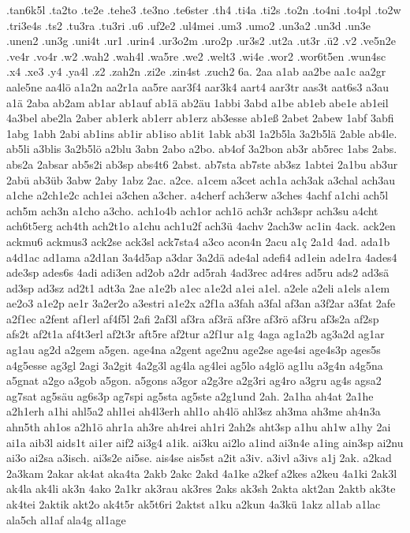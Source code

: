 {.tan6k5l
.ta2to
.te2e
.tehe3
.te3no
.te6ster
.th4
.ti4a
.ti2s
.to2n
.to4ni
.to4pl
.to2w
.tri3e4s
.ts2
.tu3ra
.tu3ri
.u6
.uf2e2
.ul4mei
.um3
.umo2
.un3a2
.un3d
.un3e
.unen2
.un3g
.uni4t
.ur1
.urin4
.ur3o2m
.uro2p
.ur3s2
.ut2a
.ut3r
.ü2
.v2
.ve5n2e
.ve4r
.vo4r
.w2
.wah2
.wah4l
.wa5re
.we2
.welt3
.wi4e
.wor2
.wor6t5en
.wun4sc
.x4
.xe3
.y4
.ya4l
.z2
.zah2n
.zi2e
.zin4st
.zuch2
6a.
2aa
a1ab
aa2be
aa1c
aa2gr
aale5ne
aa4lö
a1a2n
aa2r1a
aa5re
aar3f4
aar3k4
aart4
aar3tr
aas3t
aat6s3
a3au
a1ä
2aba
ab2am
ab1ar
ab1auf
ab1ä
ab2äu
1abbi
3abd
a1be
ab1eb
abe1e
ab1eil
4a3bel
abe2la
2aber
ab1erk
ab1err
ab1erz
ab3esse
ab1eß
2abet
2abew
1abf
3abfi
1abg
1abh
2abi
ab1ins
ab1ir
ab1iso
ab1it
1abk
ab3l
1a2b5la
3a2b5lä
2able
ab4le.
ab5li
a3blis
3a2b5lö
a2blu
3abn
2abo
a2bo.
ab4of
3a2bon
ab3r
ab5rec
1abs
2abs.
abs2a
2absar
ab5s2i
ab3sp
abs4t6
2abst.
ab7sta
ab7ste
ab3sz
1abtei
2a1bu
ab3ur
2abü
ab3üb
3abw
2aby
1abz
2ac.
a2ce.
a1cem
a3cet
ach1a
ach3ak
a3chal
ach3au
a1che
a2ch1e2c
ach1ei
a3chen
a3cher.
a4cherf
ach3erw
a3ches
4achf
a1chi
ach5l
ach5m
ach3n
a1cho
a3cho.
ach1o4b
ach1or
ach1ö
ach3r
ach3spr
ach3su
a4cht
ach6t5erg
ach4th
ach2t1o
a1chu
ach1u2f
ach3ü
4achv
2ach3w
ac1in
4ack.
ack2en
ackmu6
ackmus3
ack2se
ack3sl
ack7sta4
a3co
acon4n
2acu
a1ç
2a1d
4ad.
ada1b
a4d1ac
ad1ama
a2d1an
3a4d5ap
a3dar
3a2dä
ade4al
adefi4
ad1ein
ade1ra
4ades4
ade3sp
ades6s
4adi
adi3en
ad2ob
a2dr
ad5rah
4ad3rec
ad4res
ad5ru
ads2
ad3sä
ad3sp
ad3sz
ad2t1
adt3a
2ae
a1e2b
a1ec
a1e2d
a1ei
a1el.
a2ele
a2eli
a1els
a1em
ae2o3
a1e2p
ae1r
3a2er2o
a3estri
a1e2x
a2f1a
a3fah
a3fal
af3an
a3f2ar
a3fat
2afe
a2f1ec
a2fent
af1erl
af4f5l
2afi
2af3l
af3ra
af3rä
af3re
af3rö
af3ru
af3s2a
af2sp
afs2t
af2t1a
af4t3erl
af2t3r
aft5re
af2tur
a2f1ur
a1g
4aga
ag1a2b
ag3a2d
ag1ar
ag1au
ag2d
a2gem
a5gen.
age4na
a2gent
age2nu
age2se
age4si
age4s3p
ages5s
a4g5esse
ag3gl
2agi
3a2git
4a2g3l
ag4la
ag4lei
ag5lo
a4glö
ag1lu
a3g4n
a4g5na
a5gnat
a2go
a3gob
a5gon.
a5gons
a3gor
a2g3re
a2g3ri
ag4ro
a3gru
ag4s
agsa2
ag7sat
ag5säu
ag6s3p
ag7spi
ag5sta
ag5ste
a2g1und
2ah.
2a1ha
ah4at
2a1he
a2h1erh
a1hi
ahl5a2
ahl1ei
ah4l3erh
ahl1o
ah4lö
ahl3sz
ah3ma
ah3me
ah4n3a
ahn5th
ah1os
a2h1ö
ahr1a
ah3re
ah4rei
ah1ri
2ah2s
aht3sp
a1hu
ah1w
a1hy
2ai
ai1a
aib3l
aids1t
ai1er
aif2
ai3g4
a1ik.
ai3ku
ai2lo
a1ind
ai3n4e
a1ing
ain3sp
ai2nu
ai3o
ai2sa
a3isch.
ai3s2e
ai5se.
ais4se
ais5st
a2it
a3iv.
a3ivl
a3ivs
a1j
2ak.
a2kad
2a3kam
2akar
ak4at
aka4ta
2akb
2akc
2akd
4a1ke
a2kef
a2kes
a2keu
4a1ki
2ak3l
ak4la
ak4li
ak3n
4ako
2a1kr
ak3rau
ak3res
2aks
ak3sh
2akta
akt2an
2aktb
ak3te
ak4tei
2aktik
akt2o
ak4t5r
ak5t6ri
2aktst
a1ku
a2kun
4a3kü
1akz
al1ab
a1lac
ala5ch
al1af
ala4g
al1age
}
